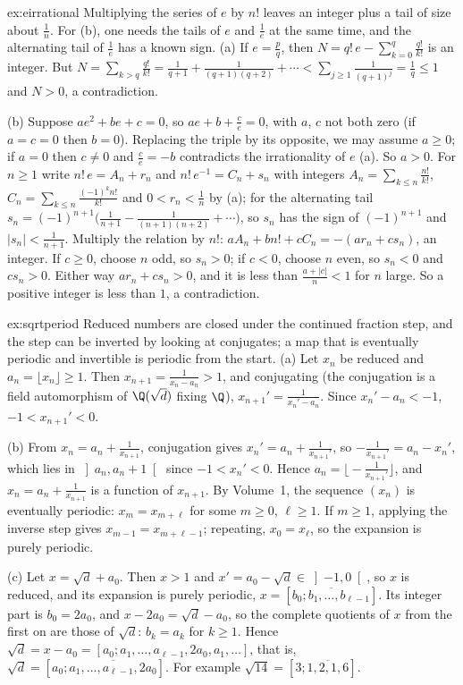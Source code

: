 \begin{solution}{ex:eirrational}
\idea Multiplying the series of $e$ by $n!$ leaves an integer plus a tail of size about $\frac1n$. For (b), one needs the tails
of $e$ and $\frac1e$ at the same time, and the alternating tail of $\frac1e$ has a known sign.
\writeup (a) If $e=\frac pq$, then $N=q!\,e-\sum_{k=0}^q\frac{q!}{k!}$ is an integer. But
$N=\sum_{k>q}\frac{q!}{k!}=\frac1{q+1}+\frac1{(q+1)(q+2)}+\cdots<\sum_{j\ge1}\frac1{(q+1)^j}=\frac1q\le1$ and $N>0$, a contradiction.

(b) Suppose $ae^2+be+c=0$, so $ae+b+\frac ce=0$, with $a$, $c$ not both zero (if $a=c=0$ then $b=0$). Replacing the triple by its
opposite, we may assume $a\ge0$; if $a=0$ then $c\ne0$ and $\frac ce=-b$ contradicts the irrationality of $e$ (a). So $a>0$. For
$n\ge1$ write $n!\,e=A_n+r_n$ and $n!\,e^{-1}=C_n+s_n$ with integers $A_n=\sum_{k\le n}\frac{n!}{k!}$,
$C_n=\sum_{k\le n}\frac{(-1)^kn!}{k!}$ and $0<r_n<\frac1n$ by (a); for the alternating tail
$s_n=(-1)^{n+1}\bigl(\frac1{n+1}-\frac1{(n+1)(n+2)}+\cdots\bigr)$, so $s_n$ has the sign of $(-1)^{n+1}$ and $|s_n|<\frac1{n+1}$. Multiply the
relation by $n!$: $aA_n+bn!+cC_n=-(ar_n+cs_n)$, an integer. If $c\ge0$, choose $n$ odd, so $s_n>0$; if $c<0$, choose $n$ even, so
$s_n<0$ and $cs_n>0$. Either way $ar_n+cs_n>0$, and it is less than $\frac{a+|c|}n<1$ for $n$ large. So a positive integer is less
than $1$, a contradiction.
\end{solution}

\begin{solution}{ex:sqrtperiod}
\idea Reduced numbers are closed under the continued fraction step, and the step can be inverted by looking at conjugates;
a map that is eventually periodic and invertible is periodic from the start.
\writeup (a) Let $x_n$ be reduced and $a_n=\lfloor x_n\rfloor\ge1$. Then $x_{n+1}=\frac1{x_n-a_n}>1$, and conjugating (the conjugation is a field
automorphism of $\Q(\sqrt d)$ fixing $\Q$), $x_{n+1}'=\frac1{x_n'-a_n}$. Since $x_n'-a_n<-1$, $-1<x_{n+1}'<0$.

(b) From $x_n=a_n+\frac1{x_{n+1}}$, conjugation gives $x_n'=a_n+\frac1{x_{n+1}'}$, so $-\frac1{x_{n+1}'}=a_n-x_n'$, which lies in $\left]a_n,a_n+1\right[$
since $-1<x_n'<0$. Hence $a_n=\bigl\lfloor-\frac1{x_{n+1}'}\bigr\rfloor$, and $x_n=a_n+\frac1{x_{n+1}}$ is a function of $x_{n+1}$. By Volume~1, the
sequence $(x_n)$ is eventually periodic: $x_m=x_{m+\ell}$ for some $m\ge0$, $\ell\ge1$. If $m\ge1$, applying the inverse step gives
$x_{m-1}=x_{m+\ell-1}$; repeating, $x_0=x_\ell$, so the expansion is purely periodic.

(c) Let $x=\sqrt d+a_0$. Then $x>1$ and $x'=a_0-\sqrt d\in\left]-1,0\right[$, so $x$ is reduced, and its expansion is purely periodic,
$x=[\overline{b_0;b_1,\dots,b_{\ell-1}}]$. Its integer part is $b_0=2a_0$, and $x-2a_0=\sqrt d-a_0$, so the complete quotients of $x$ from
the first on are those of $\sqrt d$: $b_k=a_k$ for $k\ge1$. Hence $\sqrt d=x-a_0=[a_0;a_1,\dots,a_{\ell-1},2a_0,a_1,\dots]$, that is,
$\sqrt d=[a_0;\overline{a_1,\dots,a_{\ell-1},2a_0}]$. For example $\sqrt{14}=[3;\overline{1,2,1,6}]$.
\end{solution}

